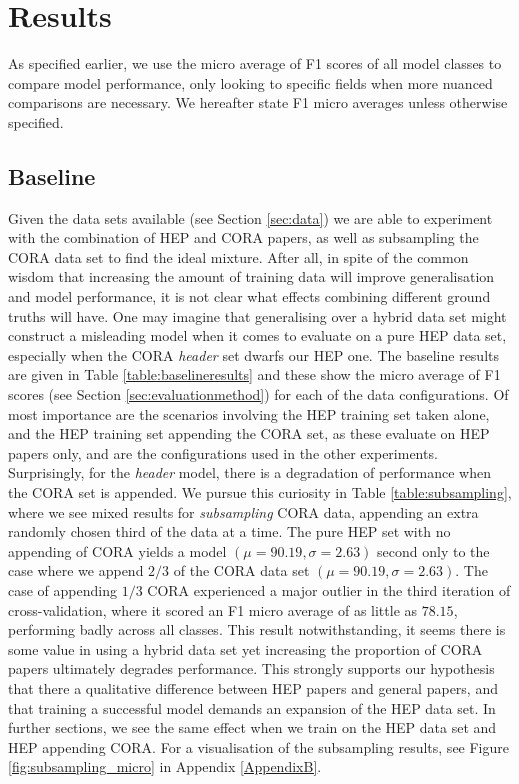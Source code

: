 \section{Results}
\label{sec:results}

As specified earlier, we use the micro average of F1 scores of all model classes to compare model performance, only looking to specific fields when more nuanced comparisons are necessary. We hereafter state F1 micro averages unless otherwise specified.

\subsection{Baseline}
\label{subsec:baslineresults}

Given the data sets available (see Section \ref{sec:data}) we are able to experiment with the combination of HEP and CORA papers, as well as subsampling the CORA data set to find the ideal mixture. After all, in spite of the common wisdom that increasing the amount of training data will improve generalisation and model performance, it is not clear what effects combining different ground truths will have. One may imagine that generalising over a hybrid data set might construct a misleading model when it comes to evaluate on a pure HEP data set, especially when the CORA \emph{header} set dwarfs our HEP one. The baseline results are given in Table \ref{table:baselineresults} and these show the micro average of F1 scores (see Section \ref{sec:evaluationmethod}) for each of the data configurations. Of most importance are the scenarios involving the HEP training set taken alone, and the HEP training set appending the CORA set, as these evaluate on HEP papers only, and are the configurations used in the other experiments. Surprisingly, for the \emph{header} model, there is a degradation of performance when the CORA set is appended. We pursue this curiosity in Table \ref{table:subsampling}, where we see mixed results for \emph{subsampling} CORA data, appending an extra randomly chosen third of the data at a time. The pure HEP set with no appending of CORA yields a model $(\mu = 90.19, \sigma = 2.63)$ second only to the case where we append $2/3$ of the CORA data set $(\mu = 90.19, \sigma = 2.63)$. The case of appending $1/3$ CORA experienced a major outlier in the third iteration of cross-validation, where it scored an F1 micro average of as little as $78.15$, performing badly across all classes. This result notwithstanding, it seems there is some value in using a hybrid data set yet increasing the proportion of CORA papers ultimately degrades performance. This strongly supports our hypothesis that there a qualitative difference between HEP papers and general papers, and that training a successful model demands an expansion of the HEP data set. In further sections, we see the same effect when we train on the HEP data set and HEP appending CORA. For a visualisation of the subsampling results, see Figure \ref{fig:subsampling_micro} in Appendix \ref{AppendixB}.

